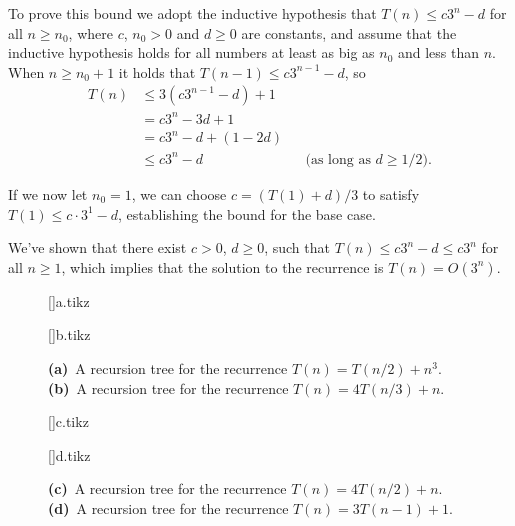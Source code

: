 To prove this bound we adopt the inductive hypothesis that $T(n)\le c3^n-d$ for all $n\ge n_0$, where $c$, $n_0>0$ and $d\ge0$ are constants, and assume that the inductive hypothesis holds for all numbers at least as big as $n_0$ and less than $n$.
When $n\ge n_0+1$ it holds that $T(n-1)\le c3^{n-1}-d$, so
\begin{align*}
    T(n) &\le 3(c3^{n-1}-d)+1 \\
    &= c3^n-3d+1 \\
    &= c3^n-d+(1-2d) \\
    &\le c3^n-d && \text{(as long as $d\ge1/2$)}.
\end{align*}

If we now let $n_0=1$, we can choose $c=(T(1)+d)/3$ to satisfy $T(1)\le c\cdot3^1-d$, establishing the bound for the base case.

We've shown that there exist $c>0$, $d\ge0$, such that $T(n)\le c3^n-d\le c3^n$ for all $n\ge1$, which implies that the solution to the recurrence is $T(n)=O(3^n)$.

\begin{figure}[!htb]
    \subcaptionbox{\label{fig:4.4-1a}}[\textwidth]{{a.tikz}}
    \par\vspace{10mm}
    \subcaptionbox{\label{fig:4.4-1b}}[\textwidth]{{b.tikz}}
    \caption{
        \textbf{(a)}\, A recursion tree for the recurrence $T(n)=T(n/2)+n^3$.\,
        \textbf{(b)}\, A recursion tree for the recurrence $T(n)=4T(n/3)+n$.
    } \label{fig:4.4-1}
\end{figure}

\begin{figure}[htb!]\ContinuedFloat
    \subcaptionbox{\label{fig:4.4-1c}}[\textwidth]{{c.tikz}}
    \par\vspace{10mm}
    \subcaptionbox{\label{fig:4.4-1d}}[\textwidth]{{d.tikz}}
    \caption{
        \textbf{(c)}\, A recursion tree for the recurrence $T(n)=4T(n/2)+n$.\,
        \textbf{(d)}\, A recursion tree for the recurrence $T(n)=3T(n-1)+1$.
    }
\end{figure}
